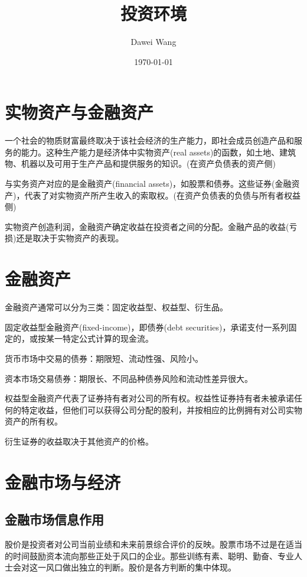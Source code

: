 \documentclass{article}
\title{投资环境}
\author{Dawei Wang}
\date{\today}
\begin{document}
	\maketitle
\section{实物资产与金融资产}
一个社会的物质财富最终取决于该社会经济的生产能力，即社会成员创造产品和服务的能力。这种生产能力是经济体中实物资产(real assets)的函数，如土地、建筑物、机器以及可用于生产产品和提供服务的知识。(在资产负债表的资产侧)

与实务资产对应的是金融资产(financial assets)，如股票和债券。这些证券(金融资产)，代表了对实物资产所产生收入的索取权。(在资产负债表的负债与所有者权益侧)

实物资产创造利润，金融资产确定收益在投资者之间的分配。金融产品的收益(亏损)还是取决于实物资产的表现。

\section{金融资产}
金融资产通常可以分为三类：固定收益型、权益型、衍生品。

固定收益型金融资产(fixed-income)，即债券(debt securities)，承诺支付一系列固定的，或按某一特定公式计算的现金流。

货币市场中交易的债券：期限短、流动性强、风险小。

资本市场交易债券：期限长、不同品种债券风险和流动性差异很大。

\hspace*{\fill}

权益型金融资产代表了证券持有者对公司的所有权。权益性证券持有者未被承诺任何的特定收益，但他们可以获得公司分配的股利，并按相应的比例拥有对公司实物资产的所有权。

\hspace*{\fill}

衍生证券的收益取决于其他资产的价格。

\section{金融市场与经济}
\subsection{金融市场信息作用}
股价是投资者对公司当前业绩和未来前景综合评价的反映。股票市场不过是在适当的时间鼓励资本流向那些正处于风口的企业。那些训练有素、聪明、勤奋、专业人士会对这一风口做出独立的判断。股价是各方判断的集中体现。
\end{document}
